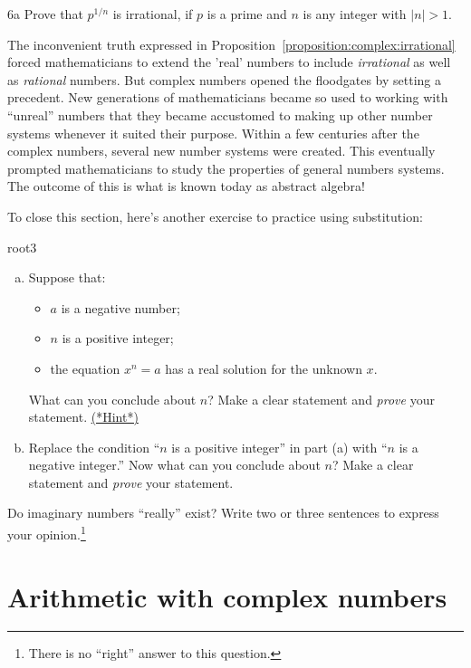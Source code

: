 \begin{exercise}{6a}
Prove that $p^{1/n}$ is irrational, if $p$ is a prime and $n$ is any integer with $|n|>1$.
\end{exercise}

The inconvenient truth expressed in Proposition~\ref{proposition:complex:irrational} forced mathematicians to extend
the 'real' numbers to include \emph{irrational} as well as \emph{rational}
numbers. But complex numbers opened the floodgates by setting a precedent. New generations of mathematicians 
became so used to working with ``unreal'' numbers that they became accustomed to making up other number systems whenever it suited their purpose.
Within a few centuries after the complex numbers, several new
number systems were created. This eventually prompted  mathematicians to study the properties of general numbers
systems. The outcome of this is what is known today as  abstract
algebra!

To close this section, here's another exercise to practice using substitution:

\begin{exercise}{root3}
\begin{enumerate}[(a)]
\item
Suppose that:
\begin{itemize}
\item
$a$ is a negative number;
\item
$n$ is a positive integer;
\item
the equation $x^n = a$ has a real solution for the unknown $x$.
\end{itemize}
What can you conclude about $n$? Make a clear statement and \emph{prove} your statement.
\hyperref[sec:complex:hints]{(*Hint*)}

\item
Replace the condition ``$n$ is a positive integer'' in part (a) with ``$n$ is a negative integer.'' Now what can you conclude about $n$? Make a clear statement and \emph{prove} your statement.
\end{enumerate}
\end{exercise}


\begin{exercise}{7} Do imaginary numbers ``really'' exist? Write
two or three sentences to express your opinion.\footnote{There is no ``right'' answer to this question.}
\end{exercise}


\section{Arithmetic with complex numbers}\label{complex_arith}
